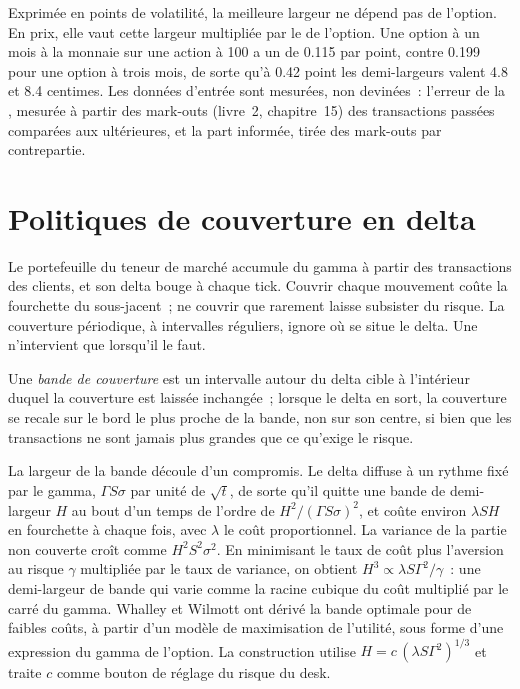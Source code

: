 Exprimée en points de volatilité, la meilleure largeur ne dépend pas de l'option. En prix, elle vaut cette largeur multipliée par le  de l'option. Une option à un mois
à la monnaie sur une action à 100 a un  de 0.115 par point, contre 0.199 pour une option à trois mois, de sorte qu'à 0.42 point les demi-largeurs valent 4.8 et 8.4 centimes.
Les données d'entrée sont mesurées, non devinées~: l'erreur de la , mesurée à partir des mark-outs (livre~2, chapitre~15) des transactions passées comparées aux  ultérieures, et la part
informée, tirée des mark-outs par contrepartie.

\section{Politiques de couverture en delta}

Le portefeuille du teneur de marché accumule du gamma à partir des transactions des clients, et son delta bouge à chaque tick. Couvrir chaque mouvement coûte la fourchette du
sous-jacent~; ne couvrir que rarement laisse subsister du risque. La couverture périodique, à intervalles réguliers, ignore où se situe le delta. Une  n'intervient que lorsqu'il le faut.

\begin{definition}\label{def:dv:options-market-making-in-practice:band}
Une \emph{bande de couverture} est un intervalle autour du delta cible à l'intérieur duquel la couverture est laissée inchangée~; lorsque le delta en sort, la
couverture se recale sur le bord le plus proche de la bande, non sur son centre, si bien que les transactions ne sont jamais plus grandes que ce qu'exige le risque.
\end{definition}

La largeur de la bande découle d'un compromis. Le delta diffuse à un rythme fixé par le gamma, $\Gamma S\sigma$ par unité de $\sqrt t$, de sorte qu'il quitte une bande de
demi-largeur $H$ au bout d'un temps de l'ordre de $H^2/(\Gamma S\sigma)^2$, et coûte environ $\lambda SH$ en fourchette à chaque fois, avec $\lambda$ le coût proportionnel.
La variance de la partie non couverte croît comme $H^2S^2\sigma^2$. En minimisant le taux de coût plus l'aversion au risque $\gamma$ multipliée par le taux de variance, on obtient
$H^3\propto\lambda S\Gamma^2/\gamma$~: une demi-largeur de bande qui varie comme la racine cubique du coût multiplié par le carré du gamma. Whalley et Wilmott ont dérivé la bande optimale
pour de faibles coûts, à partir d'un modèle de maximisation de l'utilité, sous forme d'une expression du gamma de l'option. La construction utilise $H=c\,(\lambda S\Gamma^2)^{1/3}$ et traite
$c$ comme bouton de réglage du risque du desk.

